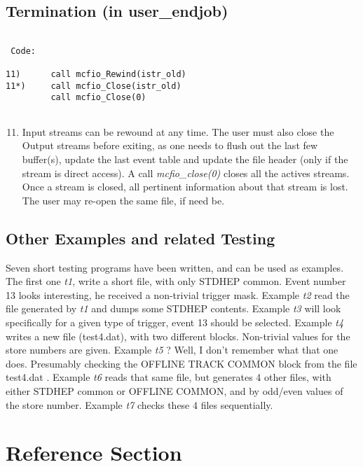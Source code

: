 \subsection{Termination (in user\_endjob)}
\vspace{.1in}
\begin{verbatim}

 Code:

11)      call mcfio_Rewind(istr_old)
11*)     call mcfio_Close(istr_old)
         call mcfio_Close(0)
	 
\end{verbatim}
\vspace{.1in}
\begin{enumerate}
\setcounter{enumi}{10}
\item Input streams  can be rewound at any time.  The user must also
 close the Output streams before exiting, as 
one needs to flush out the last few buffer(s), update the last event 
table and update the file header (only if the stream is direct access).
A call {\em mcfio\_close(0)}  closes all the actives streams. Once 
a stream is closed, all pertinent information about that stream is lost.
The user may  re-open the same file, if need be. 
\end{enumerate}


\subsection{Other Examples and  related Testing}

Seven short testing programs have been written, and can be used as  examples.
The first one {\em t1}, write a short file, with only STDHEP  common. Event
number 13 looks interesting, he received a non-trivial  trigger mask. Example
{\em t2} read the file generated by {\em t1} and dumps  some STDHEP contents.
Example {\em t3} will look specifically for a  given type of trigger, event 13
should be selected. Example {\em t4}  writes a new file (test4.dat), with two
different blocks. Non-trivial values for the  store numbers are given. Example
{\em t5} ? Well, I don't remember what that one does. Presumably checking the
OFFLINE TRACK COMMON block from the file test4.dat .
Example {\em t6} reads that same file, but generates 4 other files, with 
either STDHEP common or OFFLINE COMMON, and by odd/even values of the 
store number. Example {\em t7} checks these 4 files sequentially.

\section{Reference Section}

